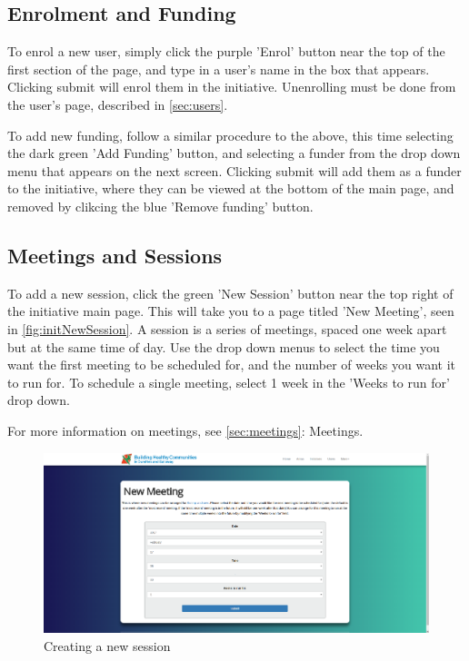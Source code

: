 \documentclass{bhcguides}
\begin{document}
\subsection{Enrolment and Funding}
\label{ssec:initenrolfund}

To enrol a new user, simply click the purple 'Enrol' button near the top of the first section of the page, and type in a user's name in the box that appears. Clicking submit will enrol them in the initiative. Unenrolling must be done from the user's page, described in \autoref{sec:users}.

To add new funding, follow a similar procedure to the above, this time selecting the dark green 'Add Funding' button, and selecting a funder from the drop down menu that appears on the next screen. Clicking submit will add them as a funder to the initiative, where they can be viewed at the bottom of the main page, and removed by clikcing the blue 'Remove funding' button.

\subsection{Meetings and Sessions}
\label{ssec:initmeets}

To add a new session, click the green 'New Session' button near the top right of the initiative main page. This will take you to a page titled 'New Meeting', seen in \autoref{fig:initNewSession}. A session is a series of meetings, spaced one week apart but at the same time of day. Use the drop down menus to select the time you want the first meeting to be scheduled for, and the number of weeks you want it to run for. To schedule a single meeting, select 1 week in the 'Weeks to run for' drop down.

For more information on meetings, see \autoref{sec:meetings}: Meetings.

\begin{figure}[h!]
 \centerline{\includegraphics[width=\textwidth, height=\textheight, keepaspectratio]{initnewsession.png}}
 \caption{Creating a new session}
 \label{fig:initNewSession}
\end{figure}
\end{document}
